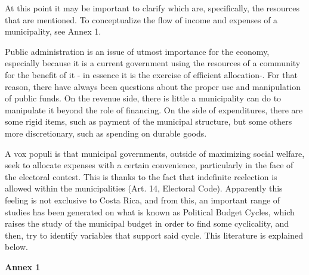 At this point it may be important to clarify which are, specifically, the resources that are mentioned. To conceptualize the flow of income and expenses of a municipality, see Annex 1.

Public administration is an issue of utmost importance for the economy, especially because it is a current government using  the resources of a community for the benefit of it - in essence it is the exercise of efficient allocation-. For that reason, there have always been questions about the proper use and manipulation of public funds. On the revenue side, there is little a municipality can do to manipulate it beyond the role of financing. On the side of expenditures, there are some rigid items, such as payment of the municipal structure, but some others more discretionary, such as spending on durable goods.

A vox populi is that municipal governments, outside of maximizing social welfare, seek to allocate expenses with a certain convenience, particularly in the face of the electoral contest. This is thanks to the fact that indefinite reelection is allowed within the municipalities (Art. 14, Electoral Code). Apparently this feeling is not exclusive to Costa Rica, and from this, an important range of studies has been generated on what is known as Political Budget Cycles, which raises the study of the municipal budget in order to find some cyclicality, and then, try to identify variables that support said cycle. This literature is explained below.


\textbf{Annex 1}

